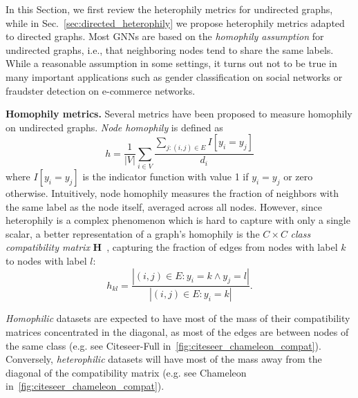 \documentclass{article}
\theoremstyle{plain}
\theoremstyle{definition}
\theoremstyle{remark}
\begin{document}
In this Section, we first review the heterophily metrics for undirected graphs, while in Sec.~\ref{sec:directed_heterophily} we propose heterophily metrics adapted to directed graphs. Most GNNs are based on the \textit{homophily assumption} for undirected graphs, i.e., that neighboring nodes tend to share the same labels. 
While a reasonable assumption in some settings, it turns out not to be true in many important applications such as gender classification on social networks or fraudster detection on e-commerce networks. 

\textbf{Homophily metrics.} Several metrics have been proposed to measure homophily on undirected graphs. {\em Node homophily} is defined as
\begin{equation}
h = \frac{1}{|V|} \sum_{i \in V} \frac{\sum_{j:(i,j)\in E}I[y_i = y_j]}{d_i}    
\end{equation}
where $I[y_i = y_j]$ is the indicator function with value 1 if $y_i = y_j$ or zero otherwise. Intuitively, node homophily measures the fraction of neighbors with the same label as the node itself, averaged across all nodes.
However, since heterophily is a complex phenomenon which is hard to capture with only a single scalar, a better representation of a graph's homophily is the $C\times C$  \textit{class compatibility matrix} $\mathbf{H}$~\cite{zhu2020beyond},  capturing the fraction of edges from nodes with label $k$ to nodes with label $l$: 
\begin{equation*}
h_{kl} = \frac{|(i,j) \in E : y_i=k \land y_j=l|}{|(i,j) \in E : y_i=k|}.    
\end{equation*}

\emph{Homophilic} datasets are expected to have most of the mass of their compatibility matrices concentrated in the diagonal, as most of the edges are between nodes of the same class (e.g. see Citeseer-Full in~\cref{fig:citeseer_chameleon_compat}). Conversely, \emph{heterophilic} datasets will have most of the mass away from the diagonal of the compatibility matrix (e.g. see Chameleon in~\cref{fig:citeseer_chameleon_compat}).
\end{document}
